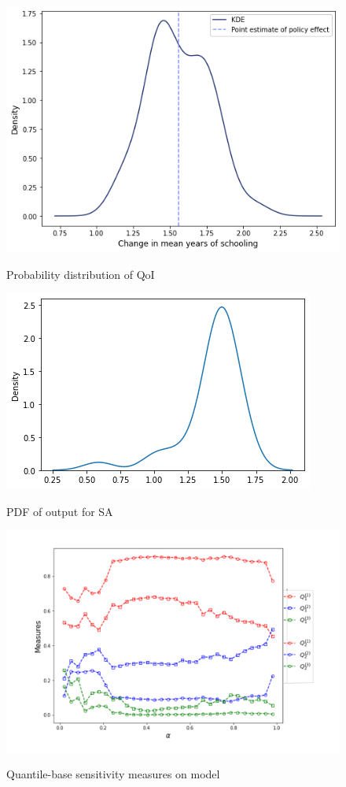 \vspace{10mm} %
\begin{figure}[H]
	\caption{Probability distribution of QoI\label{fig:4}}
	\centering
	\includegraphics[scale=0.5]{./resources/qoi}
	\label{fig:corr}
\end{figure}


\vspace{10mm} %
\begin{figure}[H]
	\caption{PDF of output for SA \label{fig:5}}
	\centering
	\includegraphics[scale=0.7]{./resources/qoi-SA}
	\label{fig:corr}
\end{figure}


\vspace{10mm} %
\begin{figure}[H]
	\caption{ Quantile-base sensitivity measures on \cite{keane1994SolutionEstimationDiscrete} model\label{fig:6}}
	\centering
	\includegraphics[scale=0.3]{./resources/QBSM}
	\label{fig:corr}
\end{figure}